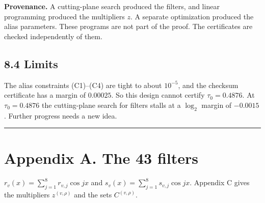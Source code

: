 \documentclass[10pt,a4paper]{article}
\begin{document}
\textbf{Provenance.} A cutting-plane search produced the filters, and linear programming produced the multipliers $z$.
A separate optimization produced the alias parameters. These programs are not part of the proof. The certificates are
checked independently of them.

\subsection*{8.4 Limits}

The alias constraints (C1)--(C4) are tight to about $10^{-5}$, and the checksum certificate has a margin of $0.00025$. So this
design cannot certify $\tau_0 = 0.4876$. At $\tau_0 = 0.4876$ the cutting-plane search for filters stalls at a
$\log_2$ margin of $-0.0015$. Further progress needs a new idea.

\medskip\noindent\rule{\linewidth}{0.4pt}\medskip

\section*{Appendix A. The 43 filters}

$r_v(x) = \sum_{j=1}^8r_{v,j}\cos jx$ and $s_v(x) = \sum_{j=1}^8s_{v,j}\cos jx$. Appendix C gives the multipliers $z^{(v,\rho)}$ and the sets $C^{(v,\rho)}$.
\end{document}
